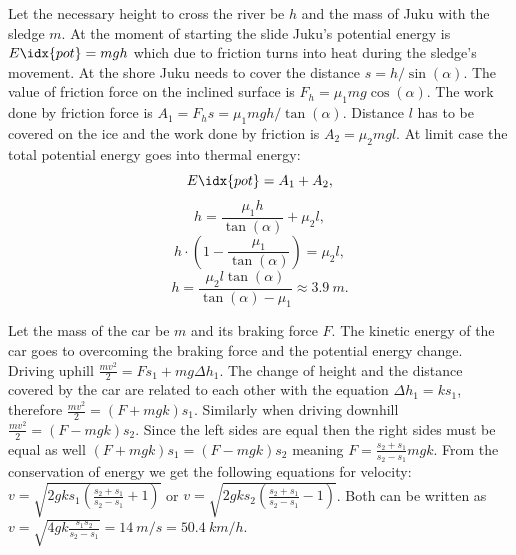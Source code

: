 \documentclass[11pt]{article}
\begin{document}

\solueng
Let the necessary height to cross the river be $h$ and the mass of Juku with the sledge $m$. At the moment of starting the slide Juku’s potential energy is $E\idx{pot} = mgh$ which due to friction turns into heat during the sledge’s movement. At the shore Juku needs to cover the distance $s = h/\sin(\alpha)$. The value of friction force on the inclined surface is $F_h=\mu_1 mg \cos(\alpha)$. The work done by friction force is $A_1 = F_h s = {\mu_1}mgh/\tan(\alpha)$. Distance $l$ has to be covered on the ice and the work done by friction is $A_2 = {\mu_2}mgl$. At limit case the total potential energy goes into thermal energy: 
$$E\idx{pot} = A_1 + A_2,$$
$$h =\frac{\mu_1 h}{\tan(\alpha)} + {\mu_2}   l, $$
$$h \cdot \left(1 - \frac{\mu_1}{\tan(\alpha)}\right) = {\mu_2}  l,$$
$$h = \frac{\mu_2 l \tan(\alpha)}{\tan(\alpha) - {\mu_1}} \approx \SI{3.9}{m}.$$
\probend
\bigskip


\solueng
Let the mass of the car be $m$ and its braking force $F$. The kinetic energy of the car goes to overcoming the braking force and the potential energy change. Driving uphill $\frac{mv^2}{2}=Fs_1+mg\Delta h_1$. The change of height and the distance covered by the car are related to each other with the equation $\Delta h_1=ks_1$, therefore $\frac{mv^2}{2}=\left(F+mgk\right)s_1$. Similarly when driving downhill $\frac{mv^2}{2}=\left(F-mgk\right)s_2$. Since the left sides are equal then the right sides must be equal as well $\left(F+mgk\right)s_1=\left(F-mgk\right)s_2$ meaning $F=\frac{s_2+s_1}{s_2-s_1}mgk$. From the conservation of energy we get the following equations for velocity: $v=\sqrt{2gks_1\left(\frac{s_2+s_1}{s_2-s_1}+1\right)}$ or $v=\sqrt{2gks_2\left(\frac{s_2+s_1}{s_2-s_1}-1\right)}$. Both can be written as $v=\sqrt{4gk\frac{s_1s_2}{s_2-s_1}}=\SI{14}{m \per s}=\SI{50.4}{km \per h}$.
\probend
\bigskip

\end{document}
